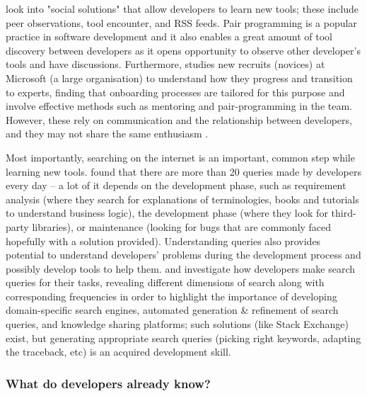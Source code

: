 \documentclass[../mpaper.tex]{subfiles}
\begin{document}
\citet{murphy-hillHowUsersDiscover2015} look into "social solutions" that allow developers to learn new tools; these include peer observations, tool encounter, and RSS feeds. Pair programming is a popular practice in software development and it also enables a great amount of tool discovery between developers \cite{cockburnCostsBenefitsPair2001} as it opens opportunity to observe other developer's tools and have discussions. Furthermore, \citet{begelNoviceSoftwareDevelopers2008} studies new recruits (novices) at Microsoft (a large organisation) to understand how they progress and transition to experts, finding that onboarding processes are tailored for this purpose and involve effective methods such as mentoring and pair-programming in the team. However, these rely on communication and the relationship between developers, and they may not share the same enthusiasm \cite{waiteStudentCultureVs2004,marzoloExtremeDevelopmentMeans2021}.

Most importantly, searching on the internet is an important, common step while learning new tools. \citet{baoTrackingAnalyzingCrossCutting2015} found that there are more than 20 queries made by developers every day -- a lot of it depends on the development phase, such as requirement analysis (where they search for explanations of terminologies, books and tutorials to understand business logic), the development phase (where they look for third-party libraries), or maintenance (looking for bugs that are commonly faced hopefully with a solution provided). Understanding queries also provides potential to understand developers' problems during the development process and possibly develop tools to help them. \citet{bajracharyaAnalyzingMiningCode2012,stoleeSolvingSearchSource2014} and \citet{sadowskiHowDevelopersSearch2015} investigate how developers make search queries for their tasks, revealing different dimensions of search along with corresponding frequencies in order to highlight the importance of developing domain-specific search engines, automated generation \& refinement of search queries, and knowledge sharing platforms; such solutions (like Stack Exchange) exist, but generating appropriate search queries (picking right keywords, adapting the traceback, etc) is an acquired development skill.

\subsubsection*{What do developers already know?}
\end{document}
